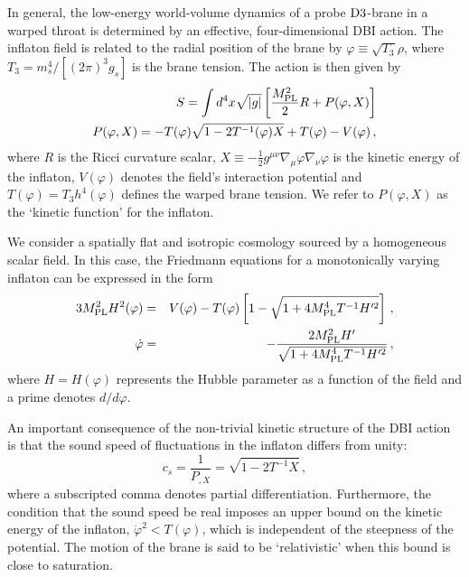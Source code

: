 In general, the low-energy world-volume dynamics
of a probe ${\rm D3}$-brane in a warped throat is determined 
by an effective, four-dimensional DBI action. 
The inflaton field is related to the radial 
position of the brane by 
$\varphi \equiv \sqrt{T_3} \rho$, where $T_3 =m_s^4/[(2\pi )^3 g_s ]$ 
is the brane tension. The action is then given by 
% 
\begin{eqnarray}
\label{eq:DBIaction-dbiintro}
S=\int  d^4x \sqrt{|g|} \left[ \frac{M_{\mathrm{PL}}^2}{2} R 
+ P (\varphi , X) \right] \\
\label{defP}
P( \varphi ,X) = - T (\varphi)  \sqrt{1 - 2T^{-1} (\varphi ) X}
+T (\varphi)  -V(\varphi)  \,,
\end{eqnarray}
% 
where $R$ is the Ricci curvature scalar,
$X \equiv - \frac{1}{2} g^{\mu\nu} \nabla_{\mu} \varphi \nabla_{\nu} \varphi$
is the kinetic energy of the inflaton, $V(\varphi )$ denotes 
the field's interaction 
potential and $T(\varphi ) = T_3 h^4 (\varphi )$
defines the warped brane tension. We refer to $P(\varphi , X)$ as the 
`kinetic function' for the inflaton. 


We consider a spatially flat and isotropic cosmology 
sourced by a homogeneous scalar field. 
In this case, the Friedmann equations for a monotonically 
varying inflaton can be expressed in the form \cite{brane6} 
% 
\begin{eqnarray}
\label{eq:Friedmann-dbiintro}
3 M_{\mathrm{PL}}^2 H^2(\varphi ) &=& V(\varphi ) -T(\varphi ) 
\left[ 1- \sqrt{1+4M_{\mathrm{PL}}^4T^{-1} H'^2} \right] \,,\\
\label{useful}
\dot{\varphi} &=& - \frac{2M_{\mathrm{PL}}^2H'}{\sqrt{1+4M_{\mathrm{PL}}^4 T^{-1} H'^2}} \, ,
\end{eqnarray}
% 
where $H=H(\varphi )$ represents the Hubble parameter
as a function of the field and a prime denotes $d/d\varphi$. 


An important consequence of the non-trivial kinetic structure 
of the DBI action is that the sound speed of fluctuations in the inflaton 
differs from unity:   
% 
\begin{equation}
\label{eq:csdefn-dbiintro}
c_s = \frac{1}{P_{,X}} = \sqrt{1 -2T^{-1}X}  \,,
\end{equation}
% 
where a subscripted comma denotes partial differentiation. 
Furthermore, the condition that the sound speed be real 
imposes an upper bound on the kinetic energy 
of the inflaton, $\dot{\varphi}^2 < T(\varphi)$, which 
is independent of the steepness of the potential.
The motion of the brane is said to be `relativistic' when this bound is 
close to saturation.
 

